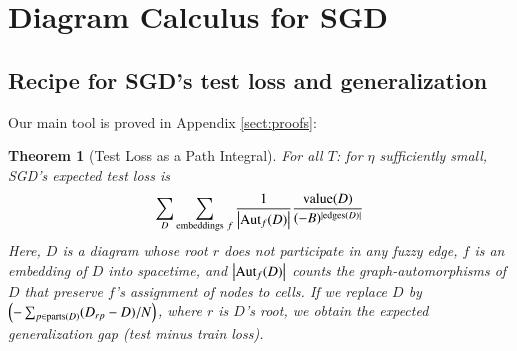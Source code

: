 \documentclass{article}
\theoremstyle{plain}
\newtheorem{thm}{Theorem}
\theoremstyle{definition}
\newcommand{\wrap}[1]{\left(#1\right)}
\newcommand{\wabs}[1]{\left|#1\right|}
\newcommand{\Aut}{\text{\textnormal{Aut}}}
\newcommand{\dvalue}{\text{\textnormal{value}}}
\newcommand{\edges}{\text{\textnormal{edges}}}
\newcommand{\parts}{\text{\textnormal{parts}}}
\begin{document}

\section{Diagram Calculus for SGD} \label{sect:calculus}

           
    \subsection{Recipe for SGD's test loss and generalization}

        Our main tool is proved in Appendix \ref{sect:proofs}:
        
        \begin{thm}[Test Loss as a Path Integral] \label{thm:sgdcoef}
            For all $T$: for $\eta$ sufficiently small, SGD's expected test
            loss is
            \begin{equation*}\label{eq:sgdcoef}
                \sum_{D}
                    \sum_{\text{embeddings}~f}
                    \frac{1}{\wabs{\Aut_f(D)}}
                \frac{\dvalue(D)}{(-B)^{|\edges(D)|}}
            \end{equation*}
            Here, $D$ is a diagram whose root $r$ does not participate in any fuzzy
            edge, $f$ is an embedding of $D$ into spacetime, and
            $\wabs{\Aut_f(D)}$ counts the graph-automorphisms of $D$ that
            preserve $f$'s assignment of nodes to cells.
            If we replace $D$ by 
            $
                \wrap{-\sum_{p \in \parts(D)} (D_{rp} - D)/N}
            $, where $r$ is $D$'s root,
            we obtain the expected generalization gap (test minus train loss).
        \end{thm}
    
\end{document}
